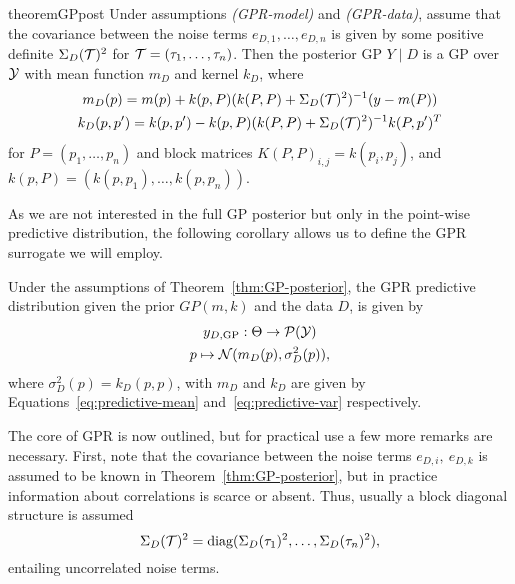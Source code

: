 \begin{restatable}[GP posterior]{theorem}{GPpost} \label{thm:GP-posterior}
    Under assumptions \textit{(GPR-model)} and \textit{(GPR-data)}, assume that the covariance between the noise terms $e_{D,1},\dots,e_{D,n}$ is given by some positive definite $\Sigma_D(\mathcal T)^2$ for $\mathcal T = (\tau_1, \ldots, \tau_n)$. \newline
    Then the posterior GP $Y \mid D$ is a GP over $\mathcal Y$ with mean function $m_D$ and kernel $k_D$, where
    \begin{gather}
        m_D(p) = m(p) + k(p, P) (k(P,P) + \Sigma_D(\mathcal T)^2 )^{-1} (y - m(P)) \label{eq:predictive-mean} \\
        k_D(p, p') = k(p, p') - k(p, P) (k(P,P) + \Sigma_D(\mathcal T)^2 )^{-1} k(P, p')^T \label{eq:predictive-var}
    \end{gather}
    for $P = (p_1, \ldots, p_n)$ and block matrices $K(P,P)_{i,j} = k(p_i, p_j)$, and $k(p, P) = (k(p, p_1), \ldots, k(p, p_n))$.
\end{restatable}

As we are not interested in the full GP posterior but only in the point-wise predictive distribution, the following corollary allows us to define the GPR surrogate we will employ.
\begin{cor}
    Under the assumptions of Theorem~\ref{thm:GP-posterior}, the GPR predictive distribution given the prior $GP(m,k)$ and the data $D$, is given by 
    \begin{gather*}
        y_{D, \text{GP}} : \Theta \rightarrow \mathcal P( \mathcal Y) \\
        p \mapsto \mathcal N( m_D(p), \sigma_D^2(p) ),
    \end{gather*}
    where $ \sigma_D^2(p) = k_D(p,p)$, with $m_D$ and $k_D$ are given by Equations~\eqref{eq:predictive-mean} and~\eqref{eq:predictive-var} respectively.
\end{cor}

The core of GPR is now outlined, but for practical use a few more remarks are necessary. \newline
First, note that the covariance between the noise terms $e_{D,i}, \ e_{D,k}$ is assumed to be known in Theorem~\ref{thm:GP-posterior}, but in practice information about correlations is scarce or absent. Thus, usually a block diagonal structure is assumed 
\begin{equation} \label{eq:GPR-noise-corr}
    \Sigma_D(\mathcal T)^2 = \text{diag}(\Sigma_D(\tau_1)^2, \ldots, \Sigma_D(\tau_n)^2),
\end{equation}
entailing uncorrelated noise terms.

